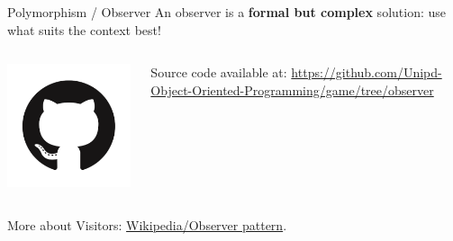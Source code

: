 \documentclass[11pt]{beamer}
\renewcommand{\emph}[1]{\textbf{#1}}
\begin{document}
\begin{frame}{Polymorphism / Observer}
 An observer is a \emph{formal but complex} solution: use what suits the context best!
 
 \begin{columns}
  \begin{column}{0.15\textwidth}
   \includegraphics[width=0.99\textwidth]{assets/logo-github}
  \end{column}
  \begin{column}{0.85\textwidth}
   Source code available at:
   \url{https://github.com/Unipd-Object-Oriented-Programming/game/tree/observer}
  \end{column}
 \end{columns}
 
 More about Visitors: \href{https://en.wikipedia.org/wiki/Observer_pattern}{Wikipedia/Observer pattern}.
\end{frame}
\end{document}
